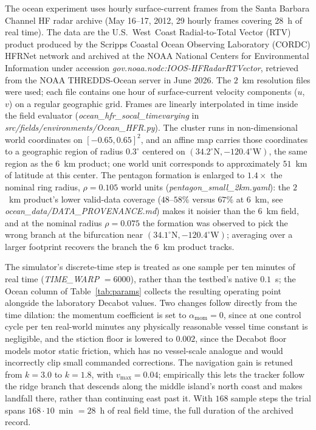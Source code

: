 \documentclass[lettersize,journal]{IEEEtran}
\begin{document}
The ocean experiment uses hourly surface-current frames from the
Santa Barbara Channel HF radar archive (May 16--17, 2012, 29 hourly
frames covering 28~h of real time). The data are the U.S.~West~Coast
Radial-to-Total Vector (RTV) product produced by the Scripps Coastal
Ocean Observing Laboratory (CORDC) HFRNet network and archived at the
NOAA National Centers for Environmental Information under accession
\textit{gov.noaa.nodc:IOOS-HFRadarRTVector}, retrieved from the NOAA
THREDDS-Ocean server in June 2026. The $2$~km resolution files were
used; each file contains one hour of surface-current velocity
components ($u$, $v$) on a regular geographic grid. Frames are
linearly interpolated in time inside the field evaluator
(\textit{ocean\_hfr\_socal\_timevarying} in
\textit{src/fields/environments/Ocean\_HFR.py}). The cluster runs in
non-dimensional world coordinates on $[-0.65, 0.65]^2$, and an affine
map carries those coordinates to a geographic region of radius
$0.3^{\circ}$ centered on $(34.2^{\circ}\mathrm{N},
-120.4^{\circ}\mathrm{W})$, the same region as the $6$~km product; one
world unit corresponds to approximately $51$~km of latitude at this
center. The pentagon formation is enlarged to $1.4\times$ the nominal
ring radius, $\rho = 0.105$ world units
(\textit{pentagon\_small\_2km.yaml}): the $2$~km product's
lower valid-data coverage ($48$--$58\%$ versus $67\%$ at $6$~km, see
\textit{ocean\_data/DATA\_PROVENANCE.md}) makes it noisier than the
$6$~km field, and at the nominal radius $\rho = 0.075$ the formation
was observed to pick the wrong branch at the bifurcation near
$(34.1^{\circ}\mathrm{N}, -120.4^{\circ}\mathrm{W})$; averaging over a
larger footprint recovers the branch the $6$~km product tracks.

The simulator's discrete-time step is treated as one sample per ten
minutes of real time (\textit{TIME\_WARP} $= 6000$), rather than the
testbed's native $0.1$~s; the Ocean column of Table~\ref{tab:params}
collects the resulting operating point alongside the laboratory
Decabot values. Two changes follow directly from the time dilation:
the momentum coefficient is set to $\alpha_{\text{mom}} = 0$, since at
one control cycle per ten real-world minutes any physically reasonable
vessel time constant is negligible, and the stiction floor is lowered
to $0.002$, since the Decabot floor models motor static friction,
which has no vessel-scale analogue and would incorrectly clip small
commanded corrections. The navigation gain is retuned from $k = 3.0$
to $k = 1.8$, with $v_{\max} = 0.04$; empirically this lets the
tracker follow the ridge branch that descends along the middle
island's north coast and makes landfall there, rather than continuing
east past it. With $168$ sample steps the trial spans $168 \cdot
10$~min $= 28$~h of real field time, the full duration of the archived
record.
\end{document}
